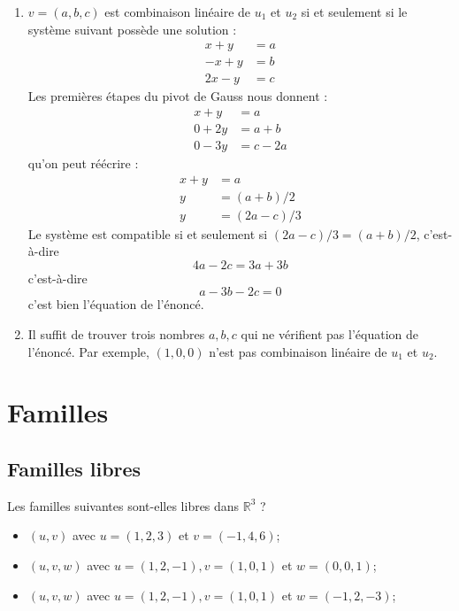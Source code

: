 {\begin{mdframed}
\begin{enumerate}
      \item $v=(a, b, c)$ est combinaison linéaire de $u_1$ et $u_2$ si et seulement si le système suivant possède une solution : 
      \begin{align*}
        x + y &= a \\
        -x + y &= b \\
        2x - y &= c
      \end{align*}
      Les premières étapes du pivot de Gauss nous donnent : 
      \begin{align*}
        x + y &= a \\
        0 + 2y &= a + b \\
        0 - 3y &= c- 2a
      \end{align*}
      qu'on peut réécrire : 
      \begin{align*}
        x + y &= a \\
        y &= (a + b)/2 \\
        y &= (2a-c)/3
      \end{align*}
      Le système est compatible si et seulement si $(2a-c)/3 = (a+b)/2$, c'est-à-dire
      $$
      4a - 2c = 3a + 3b
      $$
      c'est-à-dire
      $$
      a - 3b - 2c = 0
      $$
      c'est bien l'équation de l'énoncé.

      \item Il suffit de trouver trois nombres $a, b, c$ qui ne vérifient pas l'équation de l'énoncé. Par exemple, $(1,0,0)$ n'est pas combinaison linéaire de $u_1$ et $u_2$.
    \end{enumerate}
  \end{mdframed}
}{}


\section*{Familles}
\vspace{1em}
\subsection{Familles libres}

Les familles suivantes sont-elles libres dans $\mathbb{R}^3$ ?
\begin{itemize}
    \item $(u, v)$ avec $u=(1,2,3)$ et $v=(-1,4,6)$;
    \item $(u, v, w)$ avec $u=(1,2,-1), v=(1,0,1)$ et $w=(0,0,1)$;
    \item $(u, v, w)$ avec $u=(1,2,-1), v=(1,0,1)$ et $w=(-1,2,-3)$;
\end{itemize}

